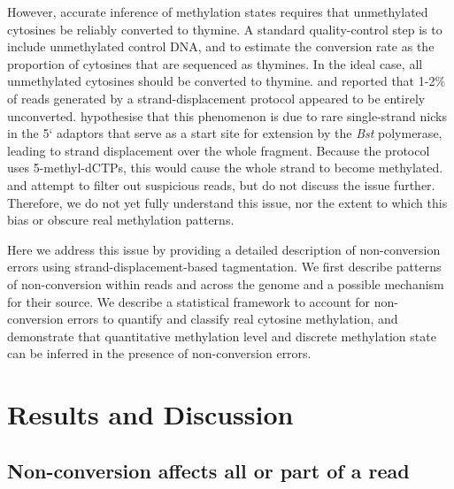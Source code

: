 \documentclass[twocolumn,twoside,lettersize]{article}
\begin{document}
However, accurate inference of methylation states requires that unmethylated cytosines be reliably converted to thymine.
A standard quality-control step is to include unmethylated control DNA, and to estimate the conversion rate as the proportion of cytosines that are sequenced as thymines.
In the ideal case, all unmethylated cytosines should be converted to thymine.
\textcite{lu2015improved} and \textcite{suzuki2018whole} reported that 1-2\% of reads generated by a strand-displacement protocol appeared to be entirely unconverted.
\textcite{lu2015improved} hypothesise that this phenomenon is due to rare single-strand nicks in the 5` adaptors that serve as a start site for extension by the \textit{Bst} polymerase, leading to strand displacement over the whole fragment.
Because the protocol uses 5-methyl-dCTPs, this would cause the whole strand to become methylated.
\textcite{lu2015improved} and \textcite{suzuki2018whole} attempt to filter out suspicious reads, but do not discuss the issue further.
Therefore, we do not yet fully understand this issue, nor the extent to which this bias or obscure real methylation patterns.

Here we address this issue by providing a detailed description of non-conversion errors using strand-displacement-based tagmentation.
We first describe patterns of non-conversion within reads and across the genome and a possible mechanism for their source.
We describe a statistical framework to account for non-conversion errors to quantify and classify real cytosine methylation, and demonstrate that quantitative methylation level and discrete methylation state can be inferred in the presence of non-conversion errors.

\section{Results and Discussion}

\subsection{Non-conversion affects all or part of a read}
\end{document}
